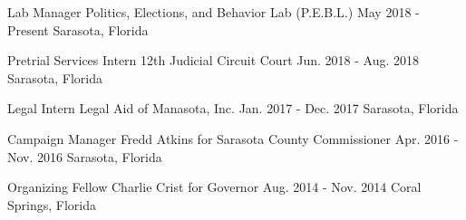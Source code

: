 

\begin{cventries}

  \cventry
    {Lab Manager} %
    {Politics, Elections, and Behavior Lab (P.E.B.L.)} %
    {May 2018 - Present} %
    {Sarasota, Florida} %
    {}

\vspace{-.25cm}
  \cventry
    {Pretrial Services Intern} %
    {12th Judicial Circuit Court} %
    {Jun. 2018 - Aug. 2018} %
    {Sarasota, Florida} %
    {}

\vspace{-.25cm}
  \cventry
    {Legal Intern} %
    {Legal Aid of Manasota, Inc.} %
    {Jan. 2017 - Dec. 2017} %
    {Sarasota, Florida} %
    {}

\vspace{-.25cm}
  \cventry
    {Campaign Manager} %
    {Fredd Atkins for Sarasota County Commissioner} %
    {Apr. 2016 - Nov. 2016} %
    {Sarasota, Florida} %
    {}

\vspace{-.25cm}
  \cventry
    {Organizing Fellow} %
    {Charlie Crist for Governor} %
    {Aug. 2014 - Nov. 2014} %
    {Coral Springs, Florida} %
    {}

\vspace{-.25cm}
\end{cventries}
